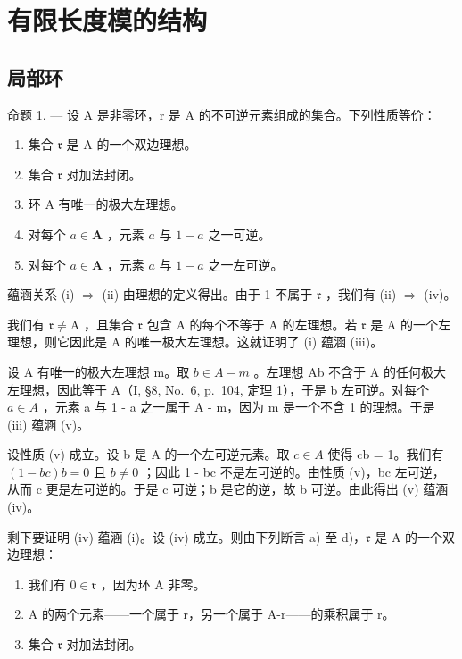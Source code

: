 \section{有限长度模的结构}

\subsection{局部环}

命题 1. --- 设 A 是非零环，r 是 A 的不可逆元素组成的集合。下列性质等价：

\begin{enumerate}
\def\labelenumi{(\roman{enumi})}
\item
  集合 \(\mathfrak{r}\) 是 A 的一个双边理想。
\item
  集合 \(\mathfrak{r}\) 对加法封闭。
\item
  环 A 有唯一的极大左理想。
\item
  对每个 \(a \in \mathbf{A}\) ，元素 \(a\) 与 \(1 - a\) 之一可逆。
\item
  对每个 \(a \in \mathbf{A}\) ，元素 \(a\) 与 \(1 - a\) 之一左可逆。
\end{enumerate}

蕴涵关系 (i) \(\Rightarrow\) (ii) 由理想的定义得出。由于 1 不属于 \(\mathfrak{r}\) ，我们有 (ii) \(\Rightarrow\) (iv)。

我们有 \(\mathfrak{r} \neq \mathrm{A}\) ，且集合 \(\mathfrak{r}\) 包含 \(\mathrm{A}\) 的每个不等于 \(\mathrm{A}\) 的左理想。若 \(\mathfrak{r}\) 是 \(\mathrm{A}\) 的一个左理想，则它因此是 \(\mathrm{A}\) 的唯一极大左理想。这就证明了 (i) 蕴涵 (iii)。

设 A 有唯一的极大左理想 m。取 \(b \in A - m\) 。左理想 Ab 不含于 A 的任何极大左理想，因此等于 A（I, §8, No.~6, p.~104, 定理 1），于是 b 左可逆。对每个 \(a \in A\) ，元素 a 与 1 - a 之一属于 A - m，因为 m 是一个不含 1 的理想。于是 (iii) 蕴涵 (v)。

设性质 (v) 成立。设 b 是 A 的一个左可逆元素。取 \(c \in A\) 使得 cb = 1。我们有 \((1 - bc)b = 0\) 且 \(b \neq 0\) ；因此 1 - bc 不是左可逆的。由性质 (v)，bc 左可逆，从而 c 更是左可逆的。于是 c 可逆；b 是它的逆，故 b 可逆。由此得出 (v) 蕴涵 (iv)。

剩下要证明 (iv) 蕴涵 (i)。设 (iv) 成立。则由下列断言 a) 至 d)，\(\mathfrak{r}\) 是 A 的一个双边理想：

\begin{enumerate}
\def\labelenumi{\alph{enumi})}
\item
  我们有 \(0 \in \mathfrak{r}\) ，因为环 A 非零。
\item
  A 的两个元素——一个属于 r，另一个属于 A-r——的乘积属于 r。
\item
  集合 \(\mathfrak{r}\) 对加法封闭。
\end{enumerate}

